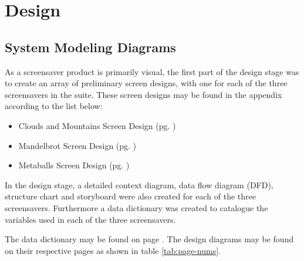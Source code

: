 \documentclass[10pt, openany]{book}
\begin{document}
{\let\clearpage\relax \chapter{Design}}

\section{System Modeling Diagrams}
As a screensaver product is primarily visual, the first part of the design stage was to create an array of preliminary screen designs, with one for each of the three screensavers in the suite.
These screen designs may be found in the appendix according to the list below:
\begin{itemize}
	\item Clouds and Mountains Screen Design (pg. \pageref{app:clouds-screen})
	\item Mandelbrot Screen Design (pg. \pageref{app:mandelbrot-screen})
	\item Metaballs Screen Design (pg. \pageref{app:metaballs-screen})
\end{itemize}

In the design stage, a detailed context diagram, data flow diagram (DFD), structure chart and storyboard were also created for each of the three screensavers. Furthermore a data dictionary was created to catalogue the variables used in each of the three screensavers.

The data dictionary may be found on page \pageref{app:data-dictionary}.
The design diagrams may be found on their respective pages as shown in table \ref{tab:page-nums}.
\end{document}
